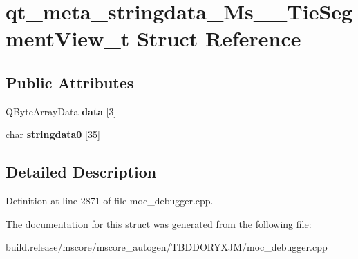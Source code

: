 \hypertarget{structqt__meta__stringdata___ms_____tie_segment_view__t}{}\section{qt\+\_\+meta\+\_\+stringdata\+\_\+\+Ms\+\_\+\+\_\+\+Tie\+Segment\+View\+\_\+t Struct Reference}
\label{structqt__meta__stringdata___ms_____tie_segment_view__t}
\subsection*{Public Attributes}
\begin{DoxyCompactItemize}
\item 
\mbox{\label{structqt__meta__stringdata___ms_____tie_segment_view__t_a81ffc8b61631cadc92d5c3269d226a39}} 
Q\+Byte\+Array\+Data {\bfseries data} \mbox{[}3\mbox{]}
\item 
\mbox{\label{structqt__meta__stringdata___ms_____tie_segment_view__t_aa0e570e8289780bfa60e368b6212413c}} 
char {\bfseries stringdata0} \mbox{[}35\mbox{]}
\end{DoxyCompactItemize}


\subsection{Detailed Description}


Definition at line 2871 of file moc\+\_\+debugger.\+cpp.



The documentation for this struct was generated from the following file\+:\begin{DoxyCompactItemize}
\item 
build.\+release/mscore/mscore\+\_\+autogen/\+T\+B\+D\+D\+O\+R\+Y\+X\+J\+M/moc\+\_\+debugger.\+cpp\end{DoxyCompactItemize}
